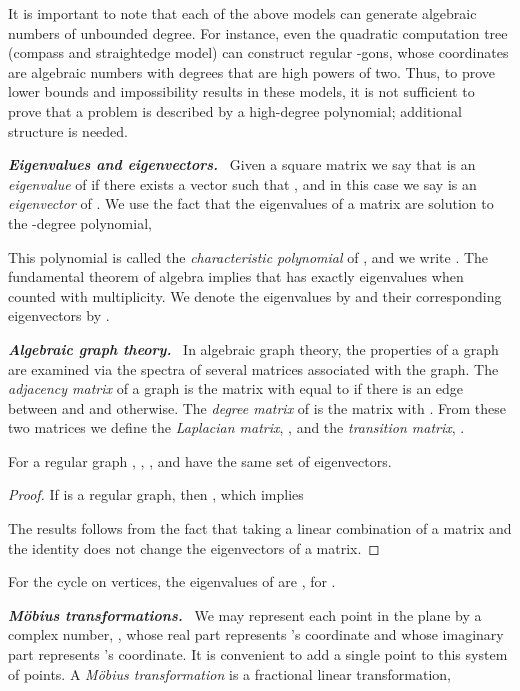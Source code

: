 \documentclass[oribibl,10pt]{llncs}
\newcommand{\Emph}[1]{\smallskip\textbf{\textit{#1}}~}
\newcommand{\nth}[1]{}
\begin{document}
It is important to note that each of
the above models can generate algebraic numbers of unbounded degree. 
For instance, even the quadratic computation tree 
(compass and straightedge model) can construct regular -gons, whose coordinates are
algebraic numbers with degrees that are high powers of two.
Thus, to prove lower bounds and impossibility results in these models, 
it is not sufficient to prove that a problem is described by a high-degree polynomial; additional structure is needed.

\ifFull
\Emph{Eigenvalues and eigenvectors.}
Given a  square matrix  we say that  is an \emph{eigenvalue} of  if there exists a vector  such that , and in this case we say  is an \emph{eigenvector} of . We use the fact that the eigenvalues of a matrix  are solution to the \nth{n}-degree polynomial,

This polynomial is called the \emph{characteristic polynomial} of ,
and we write . The fundamental theorem of algebra implies that  has exactly  eigenvalues when counted with multiplicity. We denote the  eigenvalues by  and their corresponding eigenvectors by .
\fi

\Emph{Algebraic graph theory.}
In algebraic graph theory, the properties of a graph are examined via the spectra of several matrices associated with the graph. The \emph{adjacency matrix}  of a graph  is the  matrix with  equal to  if there is an edge between  and  and  otherwise. The \emph{degree matrix}  of  is the  matrix with . From these two matrices we define the \emph{Laplacian matrix}, , 
and the \emph{transition matrix}, .

\begin{lemma}\label{lem:regular-eigenvalues}
For a regular graph ,  , , and  have the same set of eigenvectors.
\end{lemma}
\ifFull
\begin{proof}
If  is a regular graph, then , which implies

The results follows from the fact that taking a linear combination of a matrix and the identity does not change the eigenvectors of a matrix.
\end{proof}
\fi

\begin{lemma}\label{lem:cycle-eigenvalues}
For the cycle on  vertices, the eigenvalues of  are , for .
\end{lemma}

\Emph{M\"{o}bius transformations.}
We may represent each point  in the plane by a complex number,
,
whose real part represents 's  coordinate and whose 
imaginary part represents 's  coordinate.
\ifFull
It is convenient to add a single point  to this system of points.
\fi
A \emph{M\"obius transformation} is a fractional linear transformation,
\ifFull
\end{document}
